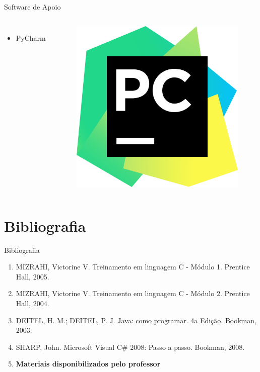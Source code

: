 \documentclass{beamer}
\begin{document}
\begin{frame}[allowframebreaks]{Software de Apoio}
    \begin{columns}
            \begin{itemize}
                \item PyCharm
            \end{itemize}
            \begin{figure}
                \includegraphics[scale=0.07]{Theme/Logos/pycharm_logo.png}
            \end{figure}
    \end{columns}

\end{frame}

\section{Bibliografia}

\begin{frame}{Bibliografia}
    \begin{enumerate}
        \item MIZRAHI, Victorine V. Treinamento em linguagem C - Módulo 1. Prentice Hall, 2005.
        \item MIZRAHI, Victorine V. Treinamento em linguagem C - Módulo 2. Prentice Hall, 2004.
        \item DEITEL, H. M.; DEITEL, P. J. Java: como programar. 4a Edição. Bookman, 2003.
        \item SHARP, John. Microsoft Visual C\# 2008: Passo a passo. Bookman, 2008.
        \item \textbf{Materiais disponibilizados pelo professor}
    \end{enumerate}
\end{frame}
\end{document}
